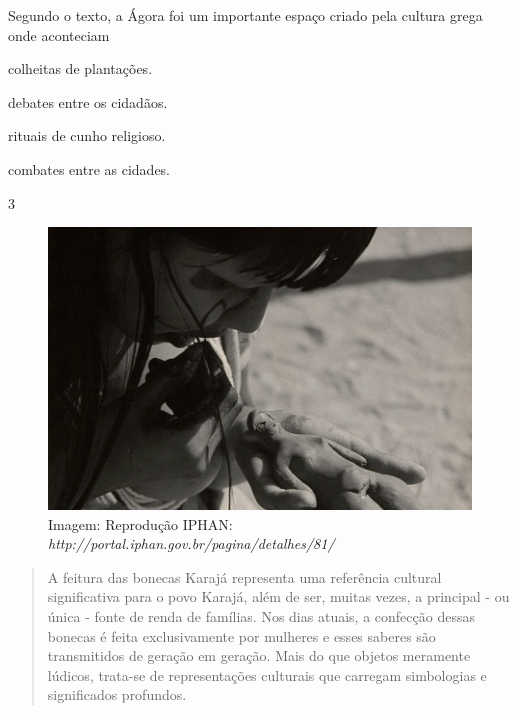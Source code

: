 \begin{itemize}
\begin{itemize}
\begin{itemize}
Segundo o texto, a Ágora foi um importante espaço criado pela cultura
grega onde aconteciam

\begin{escolha}
\item colheitas de plantações.

\item debates entre os cidadãos.

\item rituais de cunho religioso.

\item combates entre as cidades.
\end{escolha}


\num{3}

\begin{figure}[htpb!]
\includegraphics[width=.5\textwidth]{./imgs/img44.png}
\caption{Imagem: Reprodução IPHAN: \emph{http://portal.iphan.gov.br/pagina/detalhes/81/}}
\end{figure}

\begin{quote}
A feitura das bonecas Karajá representa uma referência cultural significativa para o povo Karajá, além de ser, muitas vezes, a principal - ou única - fonte de renda de famílias. Nos dias atuais, a confecção dessas bonecas é feita exclusivamente por mulheres e esses saberes são transmitidos de geração em geração. Mais do que objetos meramente lúdicos, trata-se de representações culturais que carregam simbologias e significados profundos.
\end{quote}


\end{itemize}
\end{itemize}
\end{itemize}
